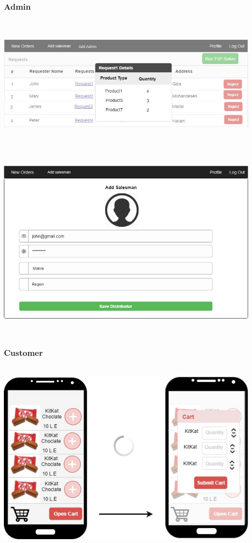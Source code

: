 \documentclass[12pt]{article}
\begin{document}
\subsubsection{ Admin }
\includegraphics[width=16.5cm,height=7cm]{./assets/prototype/provider-1.png}\\
\includegraphics[width=16.5cm,height=10cm]{./assets/prototype/provider-2.png}\\

\subsubsection{ Customer }
\includegraphics[width=16cm,height=10cm]{./assets/prototype/customer-1.png}\\
\end{document}
